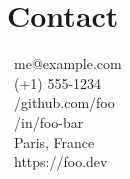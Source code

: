\documentclass{article}
\begin{document}
\section*{Contact}
\faEnvelope\ me@example.com \\
\faPhone\ (+1) 555-1234 \\
\faGithub\ /github.com/foo \\
\faLinkedin\ /in/foo-bar \\
\faMapMarker\ Paris, France \\
\faGlobe\ https://foo.dev
\end{document}

